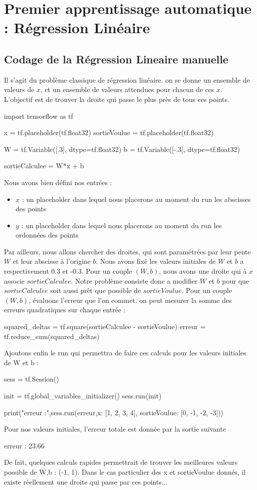 
\chapter{Premier apprentissage automatique : Régression Linéaire}

\section{Codage de la Régression Lineaire manuelle}
Il s'agit du problème classique de régression linéaire. on se donne un ensemble de valeurs de $x$, et un ensemble de valeurs attendues pour chacun de ces $x$. L'objectif est de trouver la droite qui passe le plus près de tous ces points.
\begin{mypython}
import tensorflow as tf

x = tf.placeholder(tf.float32)
sortieVoulue = tf.placeholder(tf.float32)

W = tf.Variable([.3], dtype=tf.float32)
b = tf.Variable([-.3], dtype=tf.float32)

sortieCalculee = W*x + b
\end{mypython}
Nous avons bien défini nos entrées :
\begin{itemize}
\item $x$ : un placeholder dans lequel nous placerons au moment du run les abscisses des points
\item $y$ : un placeholder dans lequel nous placerons au moment du run les ordonnées des points
\end{itemize}

Par ailleurs, nous allons chercher des droites, qui sont paramétrées par leur pente $W$ et leur abscisse à l'origine $b$. Nous avons fixé les valeurs initiales de $W$ et $b$ a respectivement 0.3 et -0.3. Pour un couple $(W,b)$, nous avons une droite qui à $x$ associe $sortieCalculee$.
Notre problème consiste donc a modifier $W$ et $b$ pour que $sortieCalculee$ soit aussi prêt que possible de $sortieVoulue$.
Pour un couple $(W,b)$, évaluons l'erreur que l'on commet. on peut mesurer la somme des erreurs quadratiques sur chaque entrée :

\begin{mypython}
squared_deltas = tf.square(sortieCalculee - sortieVoulue)
erreur = tf.reduce_sum(squared_deltas)
\end{mypython}
Ajoutons enfin le run qui permettra de faire ces calculs pour les valeurs initiales de W et b :
\begin{mypython}
sess = tf.Session()

init = tf.global_variables_initializer()
sess.run(init)

print("erreur :",sess.run(erreur,{x: [1, 2, 3, 4], sortieVoulue: [0, -1, -2, -3]}))
\end{mypython}
Pour nos valeurs initiales, l'erreur totale est donnée par la sortie suivante
\begin{myoutput}
erreur : 23.66
\end{myoutput}
De fait, quelques calculs rapides permettrait de trouver les meilleures valeurs possible de W,b : (-1, 1). Dans le cas particulier des x et sortieVoulue donnés, il existe réellement une droite qui passe par ces points...

